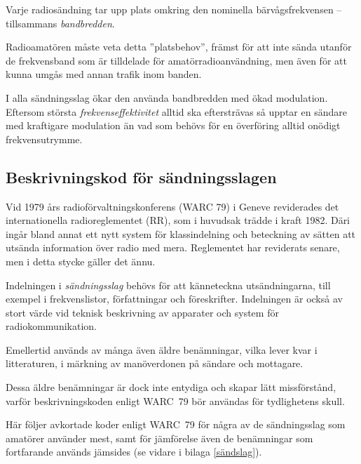 Varje radiosändning tar upp plats omkring den nominella bärvågsfrekvensen --
tillsammans \emph{bandbredden}.

Radioamatören måste veta detta ''platsbehov'', främst för att inte sända utanför
de frekvensband som är tilldelade för amatörradioanvändning, men även för att
kunna umgås med annan trafik inom banden.

I alla sändningsslag ökar den använda bandbredden med ökad modulation.
Eftersom största \emph{frekvenseffektivitet} alltid ska eftersträvas så upptar
en sändare med kraftigare modulation än vad som behövs för en överföring alltid
onödigt frekvensutrymme.

\subsection{Beskrivningskod för sändningsslagen}
\label{modulation_beskrivningskod}

Vid 1979 års radioförvaltningskonferens (WARC 79) i Geneve reviderades det
internationella radioreglementet (RR), som i huvudsak trädde i kraft 1982.
Däri ingår bland annat ett nytt system för klassindelning och beteckning av
sätten att utsända information över radio med mera.
Reglementet har reviderats senare, men i detta stycke gäller det ännu.

Indelningen i \emph{sändningsslag} behövs för att känneteckna utsändningarna,
till exempel i frekvenslistor, författningar och föreskrifter.
Indelningen är också av stort värde vid teknisk beskrivning av apparater och
system för radiokommunikation.

Emellertid används av många även äldre benämningar, vilka lever kvar i
litteraturen, i märkning av manöverdonen på sändare och mottagare.

Dessa äldre benämningar är dock inte entydiga och skapar lätt missförstånd,
varför beskrivningskoden enligt WARC~79 bör användas för tydlighetens skull.

Här följer avkortade koder enligt WARC~79 för några av de sändningsslag som
amatörer använder mest, samt för jämförelse även de benämningar som fortfarande
används jämsides (se vidare i bilaga \ref{sändslag}).

